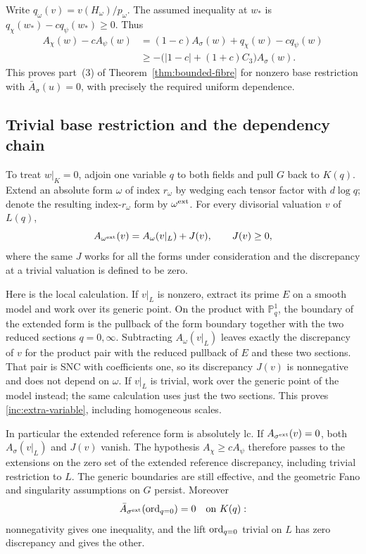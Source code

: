 Write $q_\omega(v)=v(H_\omega)/p_\omega$.  The assumed inequality
at $w_*$ is $q_\chi(w_*)-c q_\psi(w_*)\geq0$.  Thus
\begin{align*}
 A_\chi(w)-cA_\psi(w)
 &= (1-c)A_\sigma(w)+q_\chi(w)-c q_\psi(w)\\
 &\geq-\bigl(|1-c|+(1+c)C_3\bigr)A_\sigma(w).
\end{align*}
This proves part~(3) of Theorem~\ref{thm:bounded-fibre} for nonzero
base restriction with $\bar A_\sigma(u)=0$, with precisely the
required uniform dependence.

\subsection{Trivial base restriction and the dependency chain}

To treat $w|_K=0$, adjoin one variable $q$ to both fields and pull
$G$ back to $K(q)$.  Extend an absolute form $\omega$ of index
$r_\omega$ by wedging each tensor factor with $d\log q$; denote
the resulting index-$r_\omega$ form by $\omega^{\rm ext}$.
For every divisorial valuation $v$ of $L(q)$,
\begin{equation}\label{inc:extra-variable}
 A_{\omega^{\rm ext}}(v)=A_\omega(v|_L)+J(v),
 \qquad J(v)\geq0,
\end{equation}
where the same $J$ works for all the forms under consideration and
the discrepancy at a trivial valuation is defined to be zero.

Here is the local calculation.  If $v|_L$ is nonzero, extract its
prime $E$ on a smooth model and work over its generic point.  On
the product with $\mathbb P^1_q$, the boundary of the extended form
is the pullback of the form boundary together with the two reduced
sections $q=0,\infty$.  Subtracting $A_\omega(v|_L)$ leaves exactly
the discrepancy of $v$ for the product pair with the reduced
pullback of $E$ and these two sections.  That pair is SNC with
coefficients one, so its discrepancy $J(v)$ is nonnegative and
does not depend on $\omega$.  If $v|_L$ is trivial, work over the
generic point of the model instead; the same calculation uses
just the two sections.  This proves \eqref{inc:extra-variable},
including homogeneous scales.

In particular the extended reference form is absolutely lc.
If $A_{\sigma^{\rm ext}}(v)=0$, both $A_\sigma(v|_L)$ and $J(v)$
vanish.  The hypothesis $A_\chi\geq cA_\psi$ therefore passes to
the extensions on the zero set of the extended reference
discrepancy, including trivial restriction to $L$.  The generic
boundaries are still effective, and the geometric Fano and
singularity assumptions on $G$ persist.  Moreover
\[
 \bar A_{\sigma^{\rm ext}}(\operatorname{ord}_{q=0})=0
 \quad\hbox{on }K(q):
\]
nonnegativity gives one inequality, and the lift $\operatorname{ord}_{q=0}$
trivial on $L$ has zero discrepancy and gives the other.

